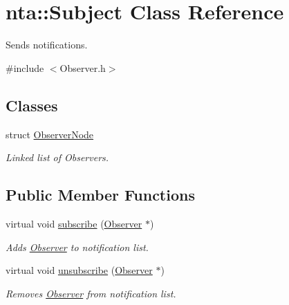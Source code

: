 \hypertarget{classnta_1_1Subject}{}\section{nta\+:\+:Subject Class Reference}
\label{classnta_1_1Subject}


Sends notifications.  




{\ttfamily \#include $<$Observer.\+h$>$}

\subsection*{Classes}
\begin{DoxyCompactItemize}
\item 
struct \hyperlink{structnta_1_1Subject_1_1ObserverNode}{Observer\+Node}
\begin{DoxyCompactList}\small\item\em Linked list of Observers. \end{DoxyCompactList}\end{DoxyCompactItemize}
\subsection*{Public Member Functions}
\begin{DoxyCompactItemize}
\item 
\mbox{\label{classnta_1_1Subject_a37d15cb0563d1c9ea93be398aaf28df7}} 
virtual void \hyperlink{classnta_1_1Subject_a37d15cb0563d1c9ea93be398aaf28df7}{subscribe} (\hyperlink{classnta_1_1Observer}{Observer} $\ast$)
\begin{DoxyCompactList}\small\item\em Adds \hyperlink{classnta_1_1Observer}{Observer} to notification list. \end{DoxyCompactList}\item 
\mbox{\label{classnta_1_1Subject_ab74c154ace2f59dafe154fe5c7416e8c}} 
virtual void \hyperlink{classnta_1_1Subject_ab74c154ace2f59dafe154fe5c7416e8c}{unsubscribe} (\hyperlink{classnta_1_1Observer}{Observer} $\ast$)
\begin{DoxyCompactList}\small\item\em Removes \hyperlink{classnta_1_1Observer}{Observer} from notification list. \end{DoxyCompactList}\end{DoxyCompactItemize}
